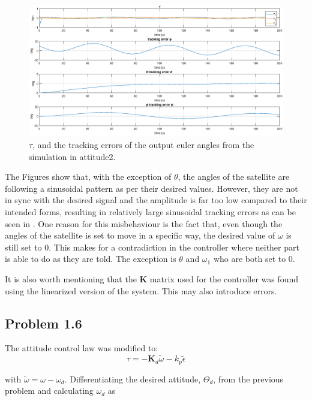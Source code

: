 \begin{figure}
	\centering
	\includegraphics[width=1.00\textwidth]{figures/2_tau_track.eps}
	\caption{ $\tau$, and the tracking errors of the output euler angles from the simulation in attitude2.}
\label{fig:sim_attitude2_track}
\end{figure}

The Figures show that, with the exception of $\theta$, the angles of the satellite are following a sinusoidal pattern as per their desired values. However, they are not in sync with the desired signal and the amplitude is far too low compared to their intended forms, resulting in relatively large sinusoidal tracking errors as can be seen in . One reason for this misbehaviour is the fact that, even though the angles of the satellite is set to move in a specific way, the desired value of $\omega$ is still set to 0. This makes for a contradiction in the controller where neither part is able to do as they are told. The exception is $\theta$ and $\omega_1$ who are both set to 0.

It is also worth mentioning that the $\mathbf{K}$ matrix used for the controller was found using the linearized version of the system. This may also introduce errors.

\subsection*{Problem 1.6}

The attitude control law was modified to:
\begin{equation}
    \tau = -\mathbf{K}_d\tilde{\omega} -k_p\tilde{\epsilon}
    \label{eq:control_law_attitude3}
\end{equation}

with $\tilde{\omega} = \omega - \omega_d$. Differentiating the desired attitude, $\Theta_d$, from the previous problem and calculating $\omega_d$ as

